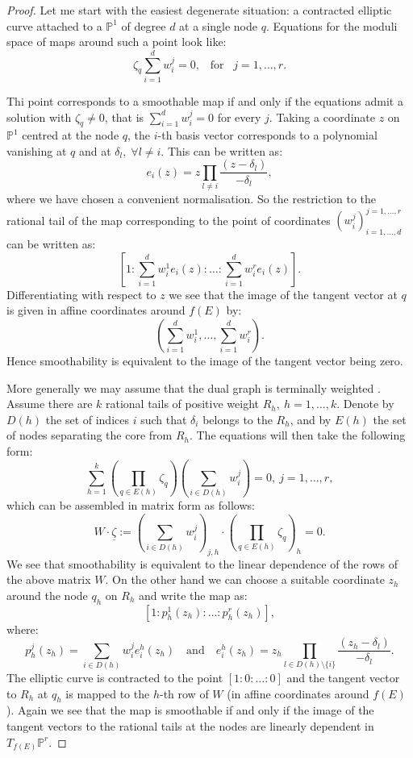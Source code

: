 \documentclass[11pt]{amsart}
\newcommand{\PP}{\mathbb P}
\theoremstyle{definition}
\theoremstyle{definition}
\begin{document}
\begin{proof}
 Let me start with the easiest degenerate situation: a contracted elliptic curve attached to a $\PP^1$ of degree $d$ at a single node $q$. Equations for the moduli space of maps around such a point look like: 
 \[\zeta_q\sum_{i=1}^d w_i^j=0,\;\;\;\text{for} \;\;\;j=1,\ldots,r.\]
 
 
  Thi point corresponds to a smoothable map if and only if the equations admit a solution with $\zeta_q\neq 0$, that is $\sum_{i=1}^d w_i^j=0$ for every $j$. Taking a coordinate $z$ on  $\PP^1$ centred at the node $q$,   the $i$-th basis vector corresponds to a polynomial vanishing at $q$ and at $\delta_l,\;\forall l\neq i$. This can be written as:
  \[e_i(z)=z\prod_{l\neq i}\frac{(z-\delta_l)}{-\delta_l},\] 
  where we have chosen a convenient normalisation. So the restriction to the rational tail of the map corresponding to the point of coordinates $(w_i^j)_{i=1,\ldots,d}^{j=1,\ldots,r}$ can be written as:
  \[[1:\sum_{i=1}^d w_i^1e_i(z):\ldots:\sum_{i=1}^d w_i^re_i(z)].\] 
  Differentiating with respect to $z$ we see that the image of the tangent vector at $q$ is given in affine coordinates around $f(E)$ by:
  \[(\sum_{i=1}^d w_i^1,\ldots,\sum_{i=1}^d w_i^r).\] 
  Hence smoothability is equivalent to the image of the tangent vector being zero.
 
 More generally we may assume that the dual graph is terminally weighted \cite[\S 3.1]{HL}. Assume there are $k$  rational tails of positive weight $R_h,\ h=1,\ldots,k$. Denote by $D(h)$ the set of indices $i$ such that $\delta_i$ belongs to the $R_h$, and by $E(h)$ the set of nodes separating the core from $R_h$. The equations will then take the following form:
 \[\sum_{h=1}^k\left(\prod_{q\in E(h)}\zeta_q\right)\left(\sum_{i\in D(h)}w_i^j\right)=0,\ j=1,\ldots,r,\]
 which can be assembled in matrix form as follows:
 $$W\cdot\underline\zeta:=\left(\sum_{i\in D(h)}w_i^j\right)_{j,h}\cdot\left(\prod_{q\in E(h)}\zeta_q\right)_h=0.$$
 We see that smoothability is equivalent to the linear dependence of the rows of the above matrix $W$. On the other hand we can choose a suitable coordinate $z_h$ around the node $q_h$ on $R_h$ and write the map as: 
 \[[1:p_h^1(z_h):\ldots:p_h^r(z_h)],\]
  where: 
 \[p_h^j(z_h)=\sum_{i\in D(h)}w_i^je_i^h(z_h) \quad \text{and} \quad e_i^h(z_h)=z_h\prod_{l\in D(h)\setminus\{i\}}\frac{(z_h-\delta_l)}{-\delta_l}.\] The elliptic curve is contracted to the point $[1:0:\ldots:0]$ and the tangent vector to $R_h$ at $q_h$ is mapped to the $h$-th row of $W$ (in affine coordinates around $f(E)$). Again we see that the map is smoothable if and only if the image of the tangent vectors to the rational tails at the nodes are linearly dependent in $T_{f(E)}\PP^r$.
 \end{proof}
\end{document}
